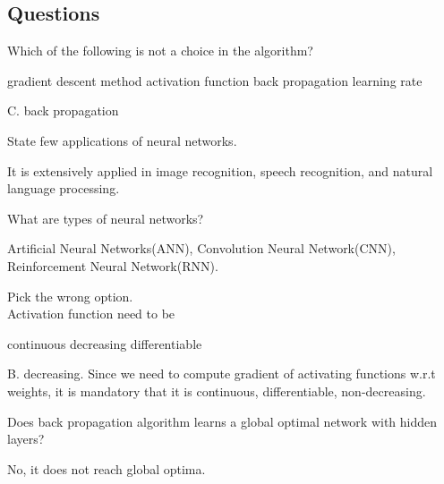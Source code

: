 \documentclass[12pt,letterpaper, onecolumn]{exam}
\begin{document}
\subsection*{Questions}
\begin{questions}
\question[] Which of the following is not a choice in the algorithm?
\begin{choices}
\choice gradient descent method
\choice activation function
\choice back propagation
\choice learning rate
\end{choices}
\begin{Solution}
C. back propagation
\end{Solution}

\question[]State few applications of neural networks.\\
\begin{Solution}
It is extensively applied in image recognition, speech recognition, and natural language processing.
\end{Solution}


\question[]What are types of neural networks?\\
\begin{Solution}
Artificial Neural Networks(ANN), Convolution Neural Network(CNN), Reinforcement Neural Network(RNN).
\end{Solution}



\question[]Pick the wrong option.\\
Activation function need to be
\begin{choices}
\choice continuous
\choice decreasing
\choice differentiable
\end{choices}
\begin{Solution}
B. decreasing. Since we need to compute gradient of activating functions w.r.t weights, it is mandatory that it is continuous, differentiable, non-decreasing.
\end{Solution}



\question[]Does back propagation algorithm learns a global optimal network  with hidden layers?\\
\begin{Solution}
No, it does not reach global optima.
\end{Solution}



\end{questions}
\end{document}
